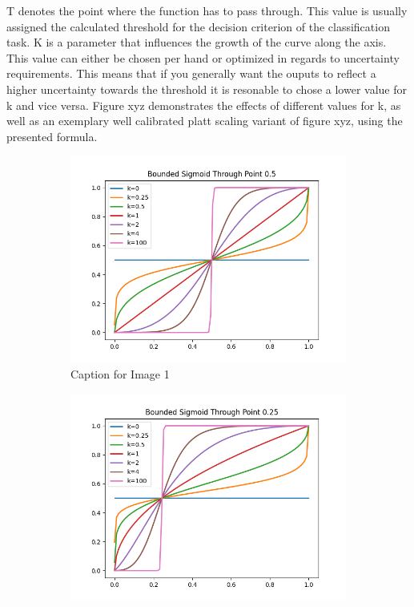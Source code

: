 T denotes the point where the function has to pass through. This value is usually assigned the calculated threshold for the decision criterion of the classification task. K is a parameter 
that influences the growth of the curve along the axis. This value can either be chosen per hand or optimized in regards to uncertainty requirements. This means that if you generally want the 
ouputs to reflect a higher uncertainty towards the threshold it is resonable to chose a lower value for k and vice versa. Figure xyz demonstrates the effects of different values for k, as well 
as an exemplary well calibrated platt scaling variant of figure xyz, using the presented formula.

\begin{figure}[htbp]
    \centering
    \begin{subfigure}[b]{0.3\textwidth}
        \includegraphics[width=\textwidth]{figures/soft_sigmoidt05.png}
        \caption{Caption for Image 1}
        \label{fig:sub1}
    \end{subfigure}
    \hfill
    \begin{subfigure}[b]{0.3\textwidth}
        \includegraphics[width=\textwidth]{figures/soft_sigmoidt25.png}

\end{subfigure}
\end{figure}
